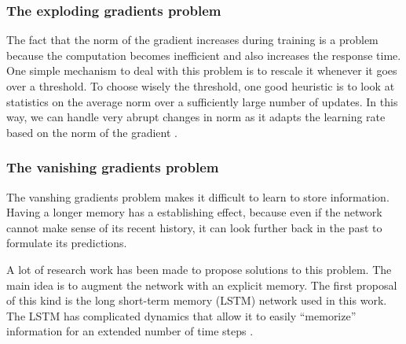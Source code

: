 
\subsubsection*{The exploding gradients problem}
 The fact that the norm of the gradient increases during training is a problem because the computation becomes inefficient and also increases the response time. One simple mechanism to deal with this problem is to rescale it whenever it goes over a threshold. To choose wisely the threshold, one good heuristic is to look at statistics on the average norm over a sufficiently large number of updates. In this way, we can handle very abrupt changes in norm as it adapts the learning rate based on the norm of the gradient  \cite{pascanu2013difficulty}.

\subsubsection*{The vanishing gradients problem}

The vanshing gradients problem makes it difficult to learn to store information. Having a longer memory has a establishing effect, because even if the network cannot make sense of its recent history, it can look further back in the past to formulate its predictions. \cite{graves2013generating}


A lot of research work has been made to propose solutions to this problem. The main idea is to augment the network with an explicit memory. The first proposal of this kind is the long short-term memory (LSTM) network used in this work. The LSTM has complicated dynamics that allow it to easily “memorize” information for an extended number of time steps \cite{zaremba2014recurrent}.

